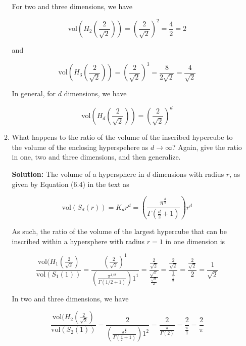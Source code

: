\documentclass[11pt]{article}
\begin{document}
\begin{enumerate}
\begin{enumerate}
For two and three dimensions, we have

\begin{equation}
\text{vol}\left(H_2\left(\frac{2}{\sqrt{2}}\right)\right) = \left(\frac{2}{\sqrt{2}}\right)^2 = \frac{4}{2} = 2
\end{equation}

and

\begin{equation}
\text{vol}\left(H_3\left(\frac{2}{\sqrt{2}}\right)\right) = \left(\frac{2}{\sqrt{2}}\right)^3 = \frac{8}{2\sqrt{2}} = \frac{4}{\sqrt{2}}
\end{equation}

In general, for $d$ dimensions, we have

\begin{equation}
\text{vol}\left(H_d\left(\frac{2}{\sqrt{2}}\right)\right) = \left(\frac{2}{\sqrt{2}}\right)^d
\end{equation}

\item What happens to the ratio of the volume of the inscribed hypercube to the volume of the enclosing hyperspehere as $d \rightarrow \infty$? Again, give the ratio in one, two and three dimensions, and then generalize.

\textbf{Solution:} The volume of a hypersphere in $d$ dimensions with radius $r$, as given by Equation (6.4) in the text as

\begin{equation}
\text{vol}(S_d(r)) = K_d r^d = \left( \frac{\pi^\frac{d}{2}}{\Gamma \left( \frac{d}{2} + 1 \right)} \right) r^d
\end{equation}

As such, the ratio of the volume of the largest hypercube that can be inscribed within a hypersphere with radius $r=1$ in one dimension is

\begin{equation}
\frac{\text{vol}(H_1(\frac{2}{\sqrt{2}})}{\text{vol}(S_1(1))} = \frac{\left(\frac{2}{\sqrt{2}}\right)^1}{\left(\frac{\pi^{1/2}}{\Gamma(1/2  + 1)}\right)1^1} = \frac{\frac{2}{\sqrt{2}}}{\frac{\sqrt{\pi}}{\frac{\sqrt{\pi}}{2}}} = \frac{\frac{2}{\sqrt{2}}}{\frac{1}{\frac{1}{2}}} = \frac{\frac{2}{\sqrt{2}}}{2} = \frac{1}{\sqrt{2}}
\end{equation}

In two and three dimensions, we have

\begin{equation}
\frac{\text{vol}(H_2(\frac{2}{\sqrt{2}})}{\text{vol}(S_2(1))} = \frac{2}{\left(\frac{\pi^\frac{2}{2}}{\Gamma(\frac{2}{2}+1)}\right)1^2} = \frac{2}{\frac{\pi}{\Gamma(2)}} = \frac{2}{\frac{\pi}{1}} = \frac{2}{\pi}
\end{equation}


\end{enumerate}
\end{enumerate}
\end{document}
